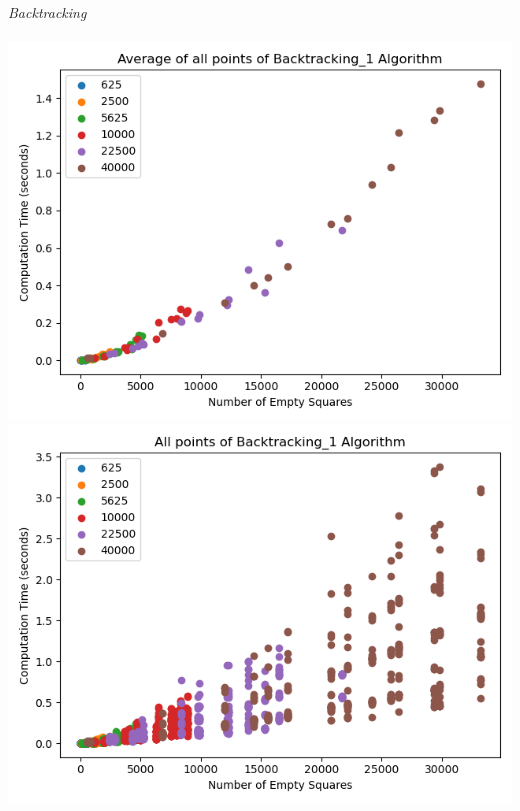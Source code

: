 \documentclass{article}
\begin{document}
\noindent \textit{Backtracking} \\ \\
\includegraphics[scale=0.5]{scatter_avg_Backtracking_1-1.png}
\includegraphics[scale=0.5]{scatter_Backtracking_1-1.png}

\bigskip
\end{document}
